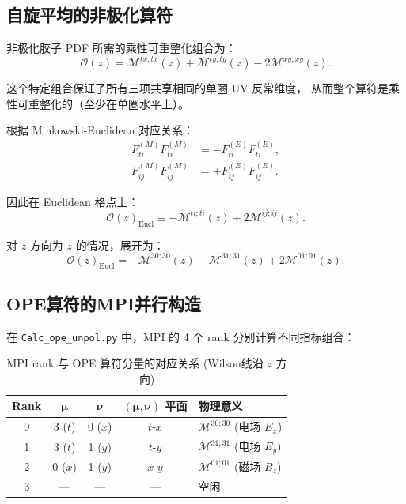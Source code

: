 \documentclass[12pt,a4paper]{ctexart}
\begin{document}
\subsection{自旋平均的非极化算符}

非极化胶子 PDF 所需的乘性可重整化组合为\cite{gluon_pdf_derivation}：
\begin{equation}\label{eq:O_renormalizable}
\boxed{
\mathcal{O}(z) = \mathcal{M}^{tx; tx}(z)
    + \mathcal{M}^{ty; ty}(z)
    - 2 \mathcal{M}^{xy; xy}(z).
}
\end{equation}

这个特定组合保证了所有三项共享相同的单圈 UV 反常维度，
从而整个算符是乘性可重整化的（至少在单圈水平上）\cite{gluon_pdf_derivation}。

根据 Minkowski-Euclidean 对应关系：
\begin{align}
F^{(M)}_{ti} F^{(M)}_{ti} &= -F^{(E)}_{ti} F^{(E)}_{ti}, \\
F^{(M)}_{ij} F^{(M)}_{ij} &= +F^{(E)}_{ij} F^{(E)}_{ij}.
\end{align}

因此在 Euclidean 格点上\cite{note_of_gluon_PDFs, 场强张量}：
\begin{equation}\label{eq:O_euclidean_expanded}
\boxed{
\mathcal{O}(z)_{\text{Eucl}} \equiv
    -\mathcal{M}^{ti; ti}(z)
    + 2 \mathcal{M}^{ij; ij}(z).
}
\end{equation}

对 $z$ 方向为 $z$ 的情况，展开为：
\begin{equation}\label{eq:O_euclidean_components}
\mathcal{O}(z)_{\text{Eucl}} = -\mathcal{M}^{30;30}(z)
    - \mathcal{M}^{31;31}(z)
    + 2 \mathcal{M}^{01;01}(z).
\end{equation}

\subsection{OPE算符的MPI并行构造}

在 \texttt{Calc\_ope\_unpol.py} 中，MPI 的 4 个 rank 分别计算不同指标组合：

\begin{table}[H]
\centering
\caption{MPI rank 与 OPE 算符分量的对应关系 (Wilson线沿 $z$ 方向)}
\begin{tabular}{c|c|c|c|l}
\toprule
\textbf{Rank} & $\bm{\mu}$ & $\bm{\nu}$ & $\bm{(\mu,\nu)}$ 平面 & \textbf{物理意义} \\
\midrule
0 & 3 ($t$)  & 0 ($x$) & $t$-$x$ & $\mathcal{M}^{30;30}$ (电场 $E_x$) \\
1 & 3 ($t$)  & 1 ($y$) & $t$-$y$ & $\mathcal{M}^{31;31}$ (电场 $E_y$) \\
2 & 0 ($x$)  & 1 ($y$) & $x$-$y$ & $\mathcal{M}^{01;01}$ (磁场 $B_z$) \\
3 & --- & --- & --- & 空闲 \\
\bottomrule
\end{tabular}
\end{table}
\end{document}
